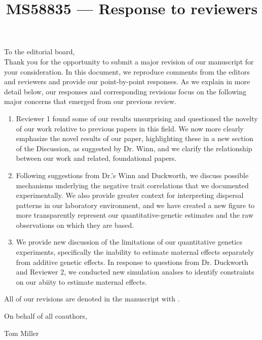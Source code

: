 \documentclass[12pt]{article}
\newcommand{\revise}[1]{{\color{Mahogany}{#1}}}
\begin{document}
\title{MS58835 --- Response to reviewers}

\maketitle
\noindent To the editorial board,\\

Thank you for the opportunity to submit a major revision of our manuscript for your consideration. In this document, we reproduce comments from the editors and reviewers and provide our point-by-point responses. As we explain in more detail below, our responses and corresponding revisions focus on the following major concerns that emerged from our previous review.
\begin{enumerate}
\item{Reviewer 1 found some of our results unsurprising and questioned the novelty of our work relative to previous papers in this field. We now more clearly emphasize the novel results of our paper, highlighting these in a new section of the Discussion, as suggested by Dr. Winn, and we clarify the relationship between our work and related, foundational papers.}
\item{Following suggestions from Dr.'s Winn and Duckworth, we discuss possible mechanisms underlying the negative trait correlations that we documented experimentally. We also provide greater context for interpreting dispersal patterns in our laboratory environment, and we have created a new figure to more transparently represent our quantitative-genetic estimates and the raw observations on which they are based.}
\item{We provide new discussion of the limitations of our quantitative genetics experiments, specifically the inability to estimate maternal effects separately from additive genetic effects. In response to questions from Dr. Duckworth and Reviewer 2, we conducted new simulation analses to identify constraints on our abiity to estimate maternal effects.}
\end{enumerate}

All of our revisions are denoted in the manuscript with \revise{Mahogany font}.

\vspace{2em}
\hfill On behalf of all coauthors,

\hfill Tom Miller
\newpage
\end{document}
